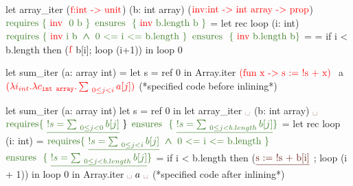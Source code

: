 \documentclass[a4paper,11pt,oneside]{article}
\theoremstyle{plain}
\newcommand{\bwedge}{\boldsymbol{~\wedge~}}
\begin{document}
\begin{adjustwidth}{-4em}{-2em}
\begin{footnotesize}
\begin{minipage}[t]{0.3\linewidth}
\begin{whycode}  
   let array_iter ($\textcolor{red}{\text{f:int -> unit}}$) (b: int array) 
                  ($\textcolor{red}{\text{inv:int -> int array -> prop}}$)    
     $\textcolor{OliveGreen}{\text{requires \{ \textcolor{red}{\text{inv }} 0~b \}}}$
     $\textcolor{OliveGreen}{\text{ensures~~}\{ \text{ \textcolor{red}{inv} b.length~b }\}}$  
   = let rec loop (i: int)
       $\textcolor{OliveGreen}{ \text{requires \{~\textcolor{red}{inv} i b} \bwedge \text{0 <= i <= b.length}~\}}$
       $\textcolor{OliveGreen}{\text{ensures~~}\{ \text{ \textcolor{red}{inv} b.length~b}\}}$ =    
       = if i < b.length then ($\textcolor{red}{\text{f}}$ b[i]; loop (i+1)) 
     in loop 0
   
   let sum_iter (a: array int) =		 
     let s = ref 0 in 
     Array.iter $\textcolor{red}{\text{(fun x -> s := !s + x)}}~$ a
                $\textcolor{red}{(\lambda i_{int}.\lambda c_{\texttt{int array}}. \sum_{~0\leq j < i} a[j])}$                                  
           (*specified code before inlining*)
\end{whycode}
\end{minipage}\hfill\vline
\begin{minipage}[t]{0.48\linewidth}
	\begin{whycode}  
   let sum_iter (a: array int)		
     let s = ref 0 in
     let array_iter $\textcolor{Sepia}{\text{\textvisiblespace}}$ (b: int array) $\textcolor{Sepia}{\text{\textvisiblespace}}$
     $\textcolor{OliveGreen}{\text{requires} \{~\underline{!s = \sum_{~0\leq j < 0} b[j]}}~\}$      
     $\textcolor{OliveGreen}{\text{ensures~~}\{~\underline{!s = \sum_{~0\leq j < b.length} b[j]}\}}$    
     = let rec loop (i: int) = 
         $\textcolor{OliveGreen}{ \text{requires} \{~\underline{!s = \sum_{~0\leq j < i} b[j] } \bwedge \text{0 <= i <= b.length}~\}}$
         $\textcolor{OliveGreen}{\text{ensures~~}\{~\underline{!s = \sum_{~0\leq j < b.length} b[j]}\}}$   
         = if i < b.length then  
         ($\textcolor{Sepia}{\text{\underline{s := !s + b[i]}}}$ ; 
          loop (i + 1)) 
       in loop 0   
     in Array.iter $\textcolor{Sepia}{\text{\textvisiblespace}}~a~\textcolor{Sepia}{\text{\textvisiblespace}}$   
               (*specified code after inlining*)
 	\end{whycode}
 	\end{minipage}
 \end{footnotesize}
\end{adjustwidth}
\end{document}
